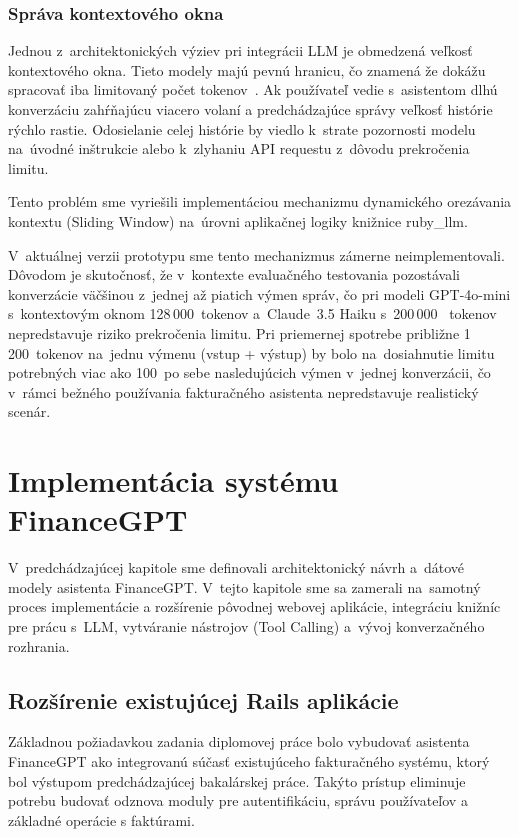 \subsubsection{Správa kontextového okna}

Jednou z~architektonických výziev pri integrácii LLM je obmedzená veľkosť
kontextového okna. Tieto modely majú pevnú hranicu, čo znamená že dokážu
spracovať iba limitovaný počet tokenov~\cite{atkinson2025}. Ak používateľ vedie s~asistentom
dlhú konverzáciu zahŕňajúcu viacero volaní a predchádzajúce správy veľkosť histórie
rýchlo rastie. Odosielanie celej histórie by viedlo k~strate pozornosti modelu
na~úvodné inštrukcie alebo k~zlyhaniu API requestu z~dôvodu prekročenia limitu.

Tento problém sme vyriešili implementáciou mechanizmu dynamického orezávania
kontextu (Sliding Window) na~úrovni aplikačnej logiky knižnice ruby\_llm.

V~aktuálnej verzii prototypu sme tento mechanizmus zámerne neimplementovali. Dôvodom
je skutočnosť, že v~kontexte evaluačného testovania pozostávali konverzácie
väčšinou z~jednej až piatich výmen správ, čo pri modeli GPT-4o-mini s~kontextovým
oknom 128\,000~tokenov a~Claude~3.5 Haiku s~200\,000~ tokenov nepredstavuje
riziko prekročenia limitu. Pri priemernej spotrebe približne 1\,200~tokenov na~jednu
výmenu (vstup + výstup) by bolo na~dosiahnutie limitu potrebných viac ako 100~po sebe
nasledujúcich výmen v~jednej konverzácii, čo v~rámci bežného používania
fakturačného asistenta nepredstavuje realistický scenár.

\section{Implementácia systému FinanceGPT}
V~predchádzajúcej kapitole sme definovali architektonický návrh a~dátové modely
asistenta FinanceGPT. V~tejto kapitole sme sa zamerali na~samotný proces implementácie
a rozšírenie pôvodnej webovej aplikácie, integráciu knižníc pre prácu s~LLM, vytváranie
nástrojov (Tool Calling) a~vývoj konverzačného rozhrania.

\subsection{Rozšírenie existujúcej Rails aplikácie}
Základnou požiadavkou zadania diplomovej práce bolo vybudovať asistenta FinanceGPT
ako integrovanú súčasť existujúceho fakturačného systému, ktorý bol výstupom
predchádzajúcej bakalárskej práce. Takýto prístup eliminuje potrebu budovať odznova
moduly pre autentifikáciu, správu používateľov a základné operácie s faktúrami.

